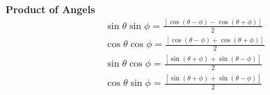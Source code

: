 \documentclass[a4paper, 10pt]{article}
\begin{document}
\begin{multicols*}{3}
\textbf{Product of Angels}
$$
\begin{aligned}
& \sin \theta \sin \phi=\frac{[\cos (\theta-\phi)-\cos (\theta+\phi)]}{2} \\
& \cos \theta \cos \phi=\frac{[\cos (\theta-\phi)+\cos (\theta+\phi)]}{2} \\
& \sin \theta \cos \phi=\frac{[\sin (\theta+\phi)+\sin (\theta-\phi)]}{2} \\
& \cos \theta \sin \phi=\frac{[\sin (\theta+\phi)+\sin (\theta-\phi)]}{2}
\end{aligned}
$$
\end{multicols*}
\end{document}
